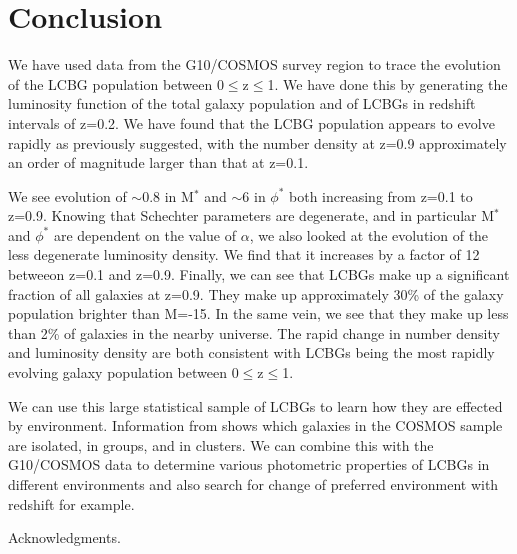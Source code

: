 \documentclass[manuscript]{aastex61}
\begin{document}
\section{Conclusion}\label{sec:Conc}
We have used data from the G10/COSMOS survey region to trace the evolution of the LCBG population between 0$\leq$z$\leq$1. We have done this by generating the luminosity function of the total galaxy population and of LCBGs in redshift intervals of z=0.2. We have found that the LCBG population appears to evolve rapidly as previously suggested, with the number density at z=0.9 approximately an order of magnitude larger than that at z=0.1. 

We see evolution of $\sim$0.8 in M$^{*}$ and $\sim$6 in $\phi^{*}$ both increasing from z=0.1 to z=0.9. Knowing that Schechter parameters are degenerate, and in particular M$^{*}$ and $\phi^{*}$ are dependent on the value of $\alpha$, we also looked at the evolution of the less degenerate luminosity density. We find that it increases  by a factor of 12 betweeon z=0.1 and z=0.9. Finally, we can see that LCBGs make up a significant fraction of all galaxies at z=0.9. They make up approximately 30\% of the galaxy population brighter than M=-15. In the same vein, we see that they make up less than 2\% of galaxies in the nearby universe.   The rapid change in number density and luminosity density are both consistent with LCBGs being the most rapidly evolving galaxy population between 0$\leq$z$\leq$1.

We can use this large statistical sample of LCBGs to learn how they are effected by environment. Information from \citet{2012ApJ...755...48K} shows which galaxies in the COSMOS sample are isolated, in groups, and in clusters. We can combine this with the G10/COSMOS data to determine various photometric properties of LCBGs in different environments and also search for change of preferred environment with redshift for example. 




\acknowledgments
Acknowledgments.
\end{document}
